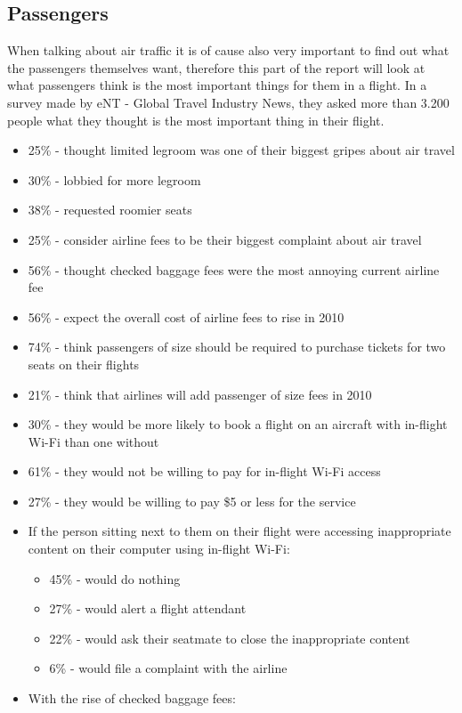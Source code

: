 \subsection{Passengers}
When talking about air traffic it is of cause also very important to find out what the passengers themselves want, therefore this part of the report will look at what passengers think is the most important things for them in a flight.
In a survey made by eNT - Global Travel Industry News, they asked more than 3.200 people what they thought is the most important thing in their flight.
\begin{itemize}
\item 25\% - thought limited legroom was one of their biggest gripes about air travel
\item 30\% - lobbied for more legroom
\item 38\% - requested roomier seats
\item 25\% - consider airline fees to be their biggest complaint about air travel
\item 56\% - thought checked baggage fees were the most annoying current airline fee
\item 56\% - expect the overall cost of airline fees to rise in 2010
\item 74\% - think passengers of size should be required to purchase tickets for two seats on their flights
\item 21\% - think that airlines will add passenger of size fees in 2010
\item 30\% - they would be more likely to book a flight on an aircraft with in-flight Wi-Fi than one without
\item 61\% - they would not be willing to pay for in-flight Wi-Fi access
\item 27\% - they would be willing to pay \$5 or less for the service
\item If the person sitting next to them on their flight were accessing inappropriate content on their computer using in-flight Wi-Fi:
\begin{itemize}
\item 45\% - would do nothing
\item 27\% - would alert a flight attendant
\item 22\% - would ask their seatmate to close the inappropriate content
\item 6\% - would file a complaint with the airline
\end{itemize}
\item With the rise of checked baggage fees:

\end{itemize}
